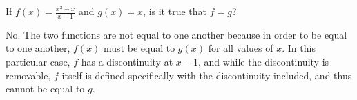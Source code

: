 \begin{exercise}
	If $f\left(x\right)=\frac{x^2-x}{x-1}$ and $g\left(x\right)=x$, is it true that $f=g$?
\end{exercise}
\begin{solution}
	No. The two functions are not equal to one another because in order to be equal to one another, $f\left(x\right)$ must be equal to $g\left(x\right)$ for all values of $x$. In this particular case, $f$ has a discontinuity at $x-1$, and while the discontinuity is removable, $f$ itself is defined specifically with the discontinuity included, and thus cannot be equal to $g$.
\end{solution}
